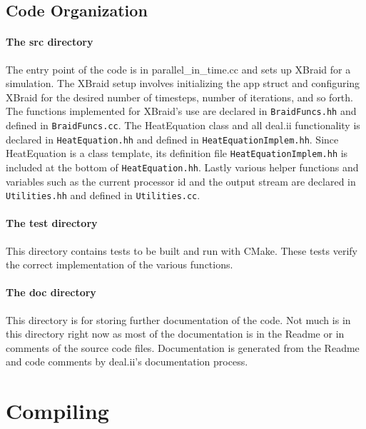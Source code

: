 \documentclass{article}
\begin{document}
\clearpage

\subsection{Code Organization}\label{code-organization}

\paragraph{The src directory}\label{the-src-directory}

The entry point of the code is in parallel\_in\_time.cc and sets up XBraid for a simulation.
The XBraid setup involves initializing the app struct and configuring XBraid for the desired number of timesteps, number of iterations, and so forth.
The functions implemented for XBraid's use are declared in \texttt{BraidFuncs.hh} and defined in \texttt{BraidFuncs.cc}.
The HeatEquation class and all deal.ii functionality is declared in \texttt{HeatEquation.hh} and defined in \texttt{HeatEquationImplem.hh}.
Since HeatEquation is a class template, its definition file \texttt{HeatEquationImplem.hh} is included at the bottom of \texttt{HeatEquation.hh}.
Lastly various helper functions and variables such as the current processor id and the output stream are declared in \texttt{Utilities.hh} and defined in \texttt{Utilities.cc}.

\paragraph{The test directory}\label{the-test-directory}

This directory contains tests to be built and run with CMake.
These tests verify the correct implementation of the various functions.

\paragraph{The doc directory}\label{the-doc-directory}

This directory is for storing further documentation of the code.
Not much is in this directory right now as most of the documentation is in the Readme or in comments of the source code files.
Documentation is generated from the Readme and code comments by deal.ii's documentation process.

\section{Compiling}\label{compiling}
\end{document}

